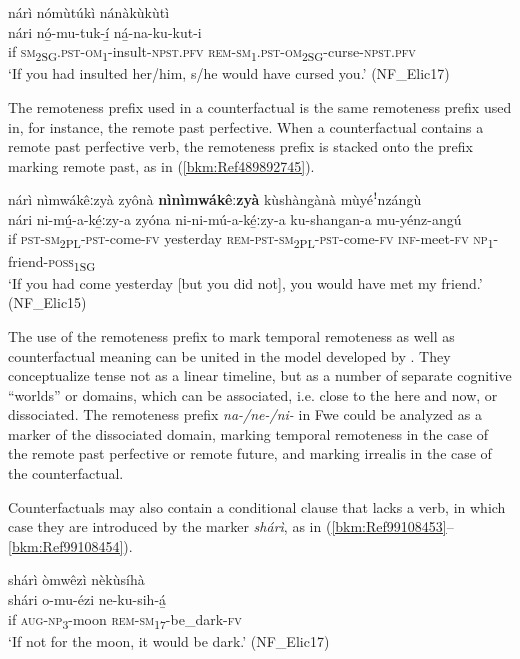 \ea
\label{bkm:Ref99108434}
nárì nómùtúkì nánàkùkùtì\\
\gll nári  nó̲-mu-tuk-í̲        ná̲-na-ku-kut-i\\
if  \textsc{sm}\textsubscript{2SG}.\textsc{pst}-\textsc{om}\textsubscript{1}-insult-\textsc{npst}.\textsc{pfv}  \textsc{rem}-\textsc{sm}\textsubscript{1}.\textsc{pst}-\textsc{om}\textsubscript{2SG}-curse-\textsc{npst}.\textsc{pfv}\\
\glt ‘If you had insulted her/him, s/he would have cursed you.’ (NF\_Elic17)
\z

The remoteness prefix used in a counterfactual is the same remoteness prefix used in, for instance, the remote past perfective. When a counterfactual contains a remote past perfective verb, the remoteness prefix is stacked onto the prefix marking remote past, as in (\ref{bkm:Ref489892745}).

\newpage
\ea
\label{bkm:Ref489892745}
nárì nìmwákêːzyà zyônà \textbf{nìnìmwákêːzyà} kùshàngànà mùyéꜝnzángù\\
\gll nári  ni-mú̲-a-ké̲ːzy-a    zyóna ni-ni-mú-a-ké̲ːzy-a      ku-shangan-a  mu-yénz-angú\\
if  \textsc{pst}-\textsc{sm}\textsubscript{2PL}-\textsc{pst}-come-\textsc{fv}  yesterday
\textsc{rem}-\textsc{pst}-\textsc{sm}\textsubscript{2PL}-\textsc{pst}-come-\textsc{fv}  \textsc{inf}-meet-\textsc{fv}    \textsc{np}\textsubscript{1}-friend-\textsc{poss}\textsubscript{1SG}\\
\glt ‘If you had come yesterday [but you did not], you would have met my friend.’ (NF\_Elic15)
\z

The use of the remoteness prefix to mark temporal remoteness as well as counterfactual meaning can be united in the model developed by \citet{BotneKershner2008}. They conceptualize tense not as a linear timeline, but as a number of separate cognitive “worlds” or domains, which can be associated, i.e. close to the here and now, or dissociated. The remoteness prefix \textit{na-/ne-/ni-} in Fwe could be analyzed as a marker of the dissociated domain, marking temporal remoteness in the case of the remote past perfective or remote future, and marking irrealis in the case of the counterfactual.

Counterfactuals may also contain a conditional clause that lacks a verb, in which case they are introduced by the marker \textit{shárì}, as in (\ref{bkm:Ref99108453}--\ref{bkm:Ref99108454}).

\ea
\label{bkm:Ref99108453}
shárì òmwêzì nèkùsíhà\\
\gll shári  o-mu-ézi    ne-ku-sih-á̲\\
if  \textsc{aug}-\textsc{np}\textsubscript{3}-moon  \textsc{rem}-\textsc{sm}\textsubscript{17}-be\_dark-\textsc{fv}\\
\glt ‘If not for the moon, it would be dark.’ (NF\_Elic17)
\z

